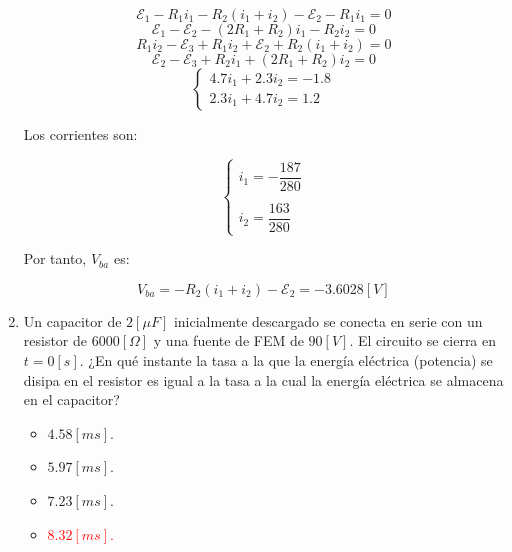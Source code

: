 \documentclass[letter,11pt]{article}
\begin{document}
\begin{enumerate}
\begin{equation*}
    \mathcal{E}_1-R_1i_1-R_2(i_1+i_2)-\mathcal{E}_2-R_1i_1 = 0
\end{equation*}
\begin{equation*}
    \mathcal{E}_1-\mathcal{E}_2-(2R_1+R_2)i_1-R_2i_2 = 0
\end{equation*}
\begin{equation*}
    R_1i_2-\mathcal{E}_3+R_1i_2+\mathcal{E}_2+R_2(i_1+i_2) = 0
\end{equation*}
\begin{equation*}
    \mathcal{E}_2-\mathcal{E}_3+R_2i_1+(2R_1+R_2)i_2 = 0
\end{equation*}
\begin{equation*}
    \begin{cases}
        4.7i_1+2.3i_2 = -1.8 \\
        2.3i_1+4.7i_2 = 1.2
    \end{cases}
\end{equation*}

Los corrientes son:

\begin{equation*}
    \begin{cases}
        i_1 = -\dfrac{187}{280} \\
        \\
        i_2 = \dfrac{163}{280}
    \end{cases}
\end{equation*}

Por tanto, $V_{ba}$ es:

\begin{equation*}
    V_{ba} = -R_2(i_1+i_2)-\mathcal{E}_2 = -3.6028 [V]
\end{equation*}

\item Un capacitor de $2 [\mu F]$ inicialmente descargado se conecta en serie
con un resistor de $6000 [\Omega]$ y una fuente de FEM de $90 [V]$. El circuito
se cierra en $t = 0 [s]$. ¿En qué instante la tasa a la que la energía eléctrica
(potencia) se disipa en el resistor es igual a la tasa a la cual la energía
eléctrica se almacena en el capacitor?

\begin{itemize}
    \item $4.58 [ms]$.
    \item $5.97 [ms]$.
    \item $7.23 [ms]$.
    \item \textcolor{red}{$8.32 [ms]$.}
\end{itemize}


\end{enumerate}
\end{document}

